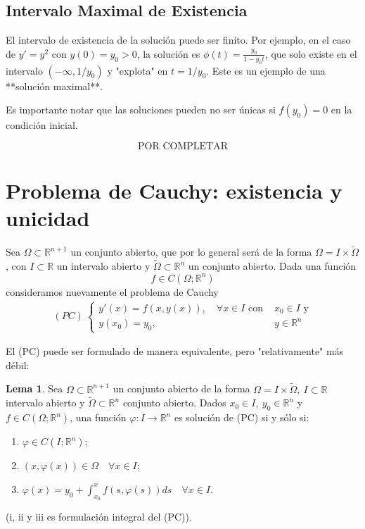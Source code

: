 \documentclass[11pt]{article}
\theoremstyle{definition} %
\newtheorem{lemma}[theorem]{Lema}
\newcommand{\R}{\mathbb{R}}
\begin{document}
\subsection{Intervalo Maximal de Existencia}
El intervalo de existencia de la solución puede ser finito. Por ejemplo, en el caso de $y' = y^2$ con $y(0) = y_0 > 0$, la solución es $\phi(t) = \frac{y_0}{1-y_0t}$, que solo existe en el intervalo $(-\infty, 1/y_0)$ y "explota" en $t = 1/y_0$. Este es un ejemplo de una **solución maximal**.

Es importante notar que las soluciones pueden no ser únicas si $f(y_0)=0$ en la condición inicial.

\[
  \text{POR COMPLETAR}
\]

\section{Problema de Cauchy: existencia y unicidad}

		Sea $\Omega \subset \R^{n+1}$ un conjunto abierto, que por lo general será de la forma $ \Omega = I \times \widetilde{\Omega}$, con $I \subset \R$ un intervalo abierto y $\widetilde{\Omega}\subset \R^{n}$ un conjunto abierto. Dada una función
		\[ f \in C (\Omega;\R^n) \]
		\noindent consideramos nuevamente el problema de Cauchy
		\begin{align*} (PC) \ \begin{cases}
			 y'(x) = f(x,y(x)), \quad \forall x \in I \text{ con } & x_0 \in I \text{ y} \\
			 y(x_0) = y_0, & y \in \R^n
		\end{cases} \end{align*}

		\noindent El (PC) puede ser formulado de manera equivalente, pero "relativamente" más débil:

		\begin{lemma}
			Sea $\Omega \subset \R^{n+1}$ un conjunto abierto de la forma $\Omega = I \times \widetilde{\Omega},\ I \subset \R$ intervalo abierto y $\widetilde{\Omega} \subset \R^n$ conjunto abierto. Dados $x_0 \in I,\ y_0 \in \R^n$ y $f \in C(\Omega;\R^n)$, una función $\varphi : I \to \R^n$ es solución de (PC) si y sólo si:
			\begin{enumerate}
				\item $\varphi \in C(I;\R^n)$;

				\item $(x,\varphi(x)) \in \Omega \quad \forall x \in I$;

				\item $\varphi (x) = y_0 + \int_{x_0}^{x} f(s,\varphi(s)) ds \quad \forall x \in I$.
			\end{enumerate}
			(i, ii y iii es formulación integral del (PC)).
		\end{lemma}
\end{document}
